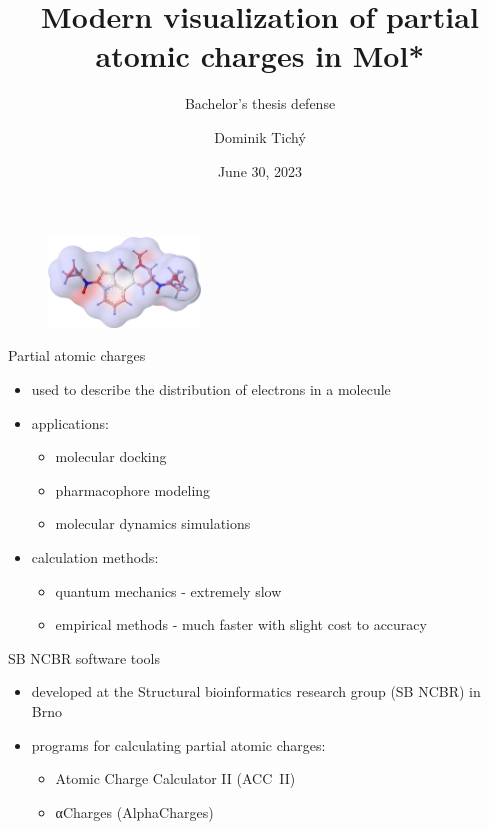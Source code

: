\documentclass[
]{beamer}
\title[Modern visualization of partial atomic charges in Mol*]{Modern visualization of partial atomic charges in Mol*}
\subtitle[Short Presentation Subtitle]{Bachelor's thesis defense}
\author[Dominik Tichý]{Dominik Tichý}
\institute[FI MU]{Faculty of Informatics, Masaryk University}
\date{June 30, 2023}
\begin{document}
\begin{frame}[plain]
\maketitle
\end{frame}

\begin{figure}
  \vspace{65pt}
  \hspace{25pt}
  \includegraphics[height=2.4cm]{images/1cp-lsd.png}
\end{figure}

\begin{frame}{Partial atomic charges}
  \begin{itemize}
    \item used to describe the distribution of electrons in a molecule
    \item applications:
    \begin{itemize}
      \item molecular docking
      \item pharmacophore modeling
      \item molecular dynamics simulations
    \end{itemize}
      \item calculation methods:
    \begin{itemize}
      \item quantum mechanics - extremely slow
      \item empirical methods - much faster with slight cost to accuracy
    \end{itemize}
  \end{itemize}
\end{frame}

\begin{frame}{SB NCBR software tools}
  \begin{itemize}
    \item developed at the Structural bioinformatics research group (SB NCBR) in Brno
    \item programs for calculating partial atomic charges:
    \begin{itemize}
      \item Atomic Charge Calculator II (ACC~II)
      \item αCharges (AlphaCharges)
    \end{itemize}
  \end{itemize}
\end{frame}
\end{document}
